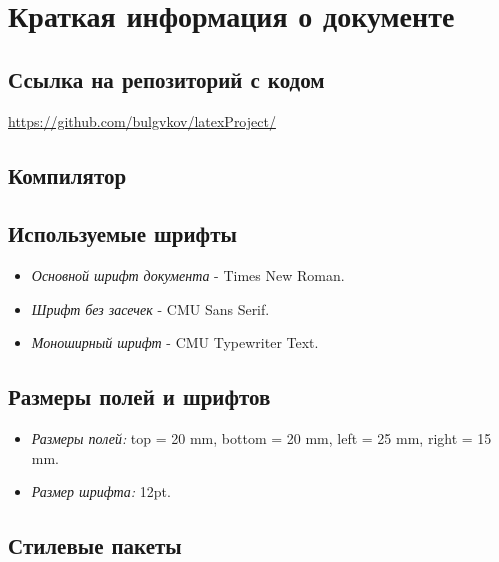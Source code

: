 \documentclass[a4paper,12pt]{report}
\begin{document}
\newpage

\chapter{Краткая информация о документе}

\section{Ссылка на репозиторий с кодом}

\url{https://github.com/bulgvkov/latexProject/}

\section{Компилятор}


\section{Используемые шрифты}

\begin{itemize}
\item \textit{Основной шрифт документа} - Times New Roman. 
\item \textit{Шрифт без засечек} - CMU Sans Serif. 
\item \textit{Моноширный шрифт} - CMU Typewriter Text.
\end{itemize}
 
\section{Размеры полей и шрифтов}

\begin{itemize}
\item \textit{Размеры полей:} top = 20 mm, bottom = 20 mm, left = 25 mm, right = 15 mm. 
\item \textit{Размер шрифта:} 12pt.
\end{itemize}

\section{Стилевые пакеты}
\end{document}
